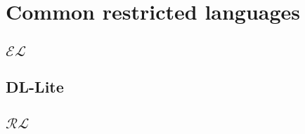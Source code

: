 \section{Common restricted languages}

\subsection{$\mathcal{EL}$}

\subsection{DL-Lite}

\subsection{$\mathcal{RL}$}